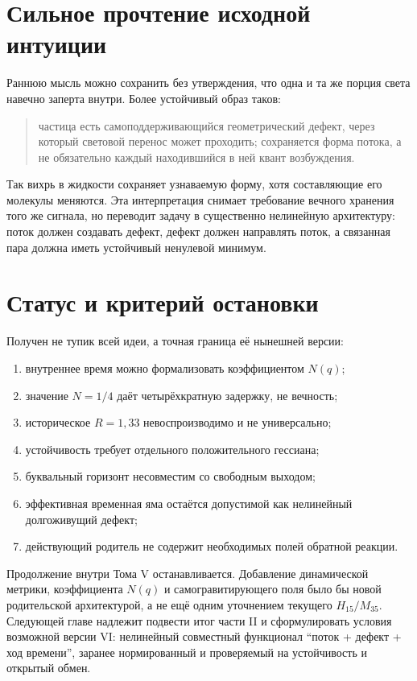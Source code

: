 \section{Сильное прочтение исходной интуиции}

Раннюю мысль можно сохранить без утверждения, что одна и та же порция
света навечно заперта внутри. Более устойчивый образ таков:
\begin{quote}
частица есть самоподдерживающийся геометрический дефект, через который
световой перенос может проходить; сохраняется форма потока, а не
обязательно каждый находившийся в ней квант возбуждения.
\end{quote}
Так вихрь в жидкости сохраняет узнаваемую форму, хотя составляющие его
молекулы меняются. Эта интерпретация снимает требование вечного хранения
того же сигнала, но переводит задачу в существенно нелинейную архитектуру:
поток должен создавать дефект, дефект должен направлять поток, а связанная
пара должна иметь устойчивый ненулевой минимум.

\section{Статус и критерий остановки}

Получен не тупик всей идеи, а точная граница её нынешней версии:
\begin{enumerate}
 \item внутреннее время можно формализовать коэффициентом $N(q)$;
 \item значение $N=1/4$ даёт четырёхкратную задержку, не вечность;
 \item историческое $R=1{,}33$ невоспроизводимо и не универсально;
 \item устойчивость требует отдельного положительного гессиана;
 \item буквальный горизонт несовместим со свободным выходом;
 \item эффективная временная яма остаётся допустимой как нелинейный
 долгоживущий дефект;
 \item действующий родитель не содержит необходимых полей обратной реакции.
\end{enumerate}

Продолжение внутри Тома V останавливается. Добавление динамической метрики,
коэффициента $N(q)$ и самогравитирующего поля было бы новой родительской
архитектурой, а не ещё одним уточнением текущего $H_{15}/M_{35}$. Следующей
главе надлежит подвести итог части II и сформулировать условия возможной
версии VI: нелинейный совместный функционал ``поток + дефект + ход
времени'', заранее нормированный и проверяемый на устойчивость и открытый
обмен.

